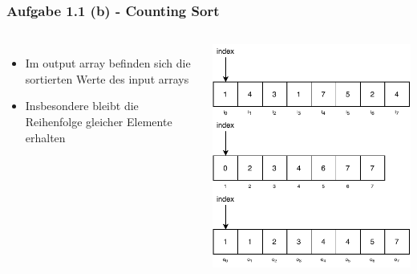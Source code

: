 \documentclass[aspectratio=169]{beamer}
\begin{document}
\begin{frame}
	\frametitle{Aufgabe 1.1 (b) - Counting Sort}
	\begin{columns}[c] %
	
	\begin{itemize}
		\item Im output array befinden sich die sortierten Werte des input arrays
		\item Insbesondere bleibt die Reihenfolge gleicher Elemente erhalten
	\end{itemize}
	
	\includegraphics[scale=.7]{cs14.pdf}
	
	\end{columns}
	\end{frame}
\end{document}

